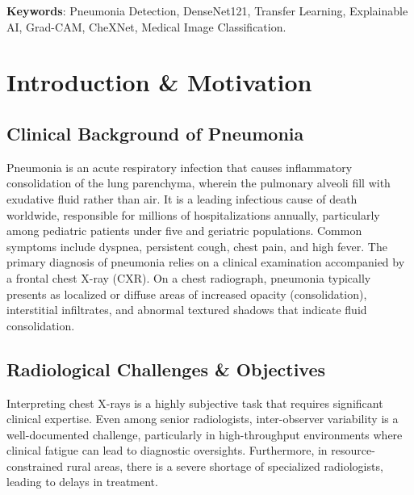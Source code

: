 \documentclass[12pt,oneside]{report}
\begin{document}
\vspace*{1cm}
\noindent \textbf{Keywords}: Pneumonia Detection, DenseNet121, Transfer Learning, Explainable AI, Grad-CAM, CheXNet, Medical Image Classification.

\newpage
\tableofcontents

\chapter{Introduction \& Motivation}

\section{Clinical Background of Pneumonia}
Pneumonia is an acute respiratory infection that causes inflammatory consolidation of the lung parenchyma, wherein the pulmonary alveoli fill with exudative fluid rather than air. It is a leading infectious cause of death worldwide, responsible for millions of hospitalizations annually, particularly among pediatric patients under five and geriatric populations. Common symptoms include dyspnea, persistent cough, chest pain, and high fever. The primary diagnosis of pneumonia relies on a clinical examination accompanied by a frontal chest X-ray (CXR). On a chest radiograph, pneumonia typically presents as localized or diffuse areas of increased opacity (consolidation), interstitial infiltrates, and abnormal textured shadows that indicate fluid consolidation.

\section{Radiological Challenges \& Objectives}
Interpreting chest X-rays is a highly subjective task that requires significant clinical expertise. Even among senior radiologists, inter-observer variability is a well-documented challenge, particularly in high-throughput environments where clinical fatigue can lead to diagnostic oversights. Furthermore, in resource-constrained rural areas, there is a severe shortage of specialized radiologists, leading to delays in treatment.
\end{document}
